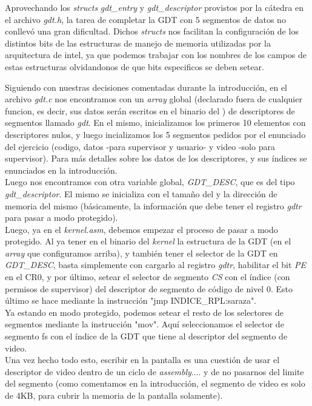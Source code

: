 Aprovechando los \textit{structs} \textit{gdt\_entry} y \textit{gdt\_descriptor} provistos por la cátedra en el archivo \textit{gdt.h}, la tarea de completar la GDT con 5 segmentos de datos no conllevó una gran dificultad. Dichos \textit{structs} nos facilitan la configuración de los distintos bits de las estructuras de manejo de memoria utilizadas por la arquitectura de intel, ya que podemos trabajar con los nombres de los campos de estas estructuras olvidandonos de que bits especificos se deben setear.

Siguiendo con nuestras decisiones comentadas durante la introducción, en el archivo \textit{gdt.c} nos encontramos con un \textit{array} global (declarado fuera de cualquier funcion, es decir, sus datos serán escritos en el binario del ) de descriptores de segmentos llamado \textit{gdt}. En el mismo, inicializamos los primeros 10 elementos con descriptores nulos, y luego incializamos los 5 segmentos pedidos por el enunciado del ejercicio (codigo, datos -para supervisor y usuario- y video -solo para supervisor). Para más detalles sobre los datos de los descriptores, y sus índices se enunciados en la introducción.\\

Luego nos encontramos con otra variable global, \textit{GDT\_DESC}, que es del tipo \textit{gdt\_descriptor}. El mismo se inicializa con el tamaño del  y la dirección de memoria del mismo (básicamente, la información que debe tener el registro \textit{gdtr} para pasar a modo protegido).\\

Luego, ya en el \textit{kernel.asm}, debemos empezar el proceso de pasar a modo protegido. Al ya tener en el binario del \textit{kernel} la estructura de la GDT (en el \textit{array} que configuramos arriba), y también tener el selector de la GDT en \textit{GDT\_DESC}, basta simplemente con cargarlo al registro \textit{gdtr}, habilitar el bit \textit{PE} en el CR0, y por último, setear el selector de segmento \textit{CS} con el índice (con permisos de supervisor) del descriptor de segmento de código de nivel 0. Esto último se hace mediante la instrucción "jmp INDICE\_RPL:saraza".\\

Ya estando en modo protegido, podemos setear el resto de los selectores de segmentos mediante la instrucción "mov". Aquí seleccionamos el selector de segmento fs con el índice de la GDT que tiene al descriptor del segmento de video.\\

Una vez hecho todo esto, escribir en la pantalla es una cuestión de usar el descriptor de video dentro de un ciclo de \textit{assembly}.... y de no pasarnos del limite del segmento (como comentamos en la introducción, el segmento de video es solo de 4KB, para cubrir la memoria de la pantalla solamente).